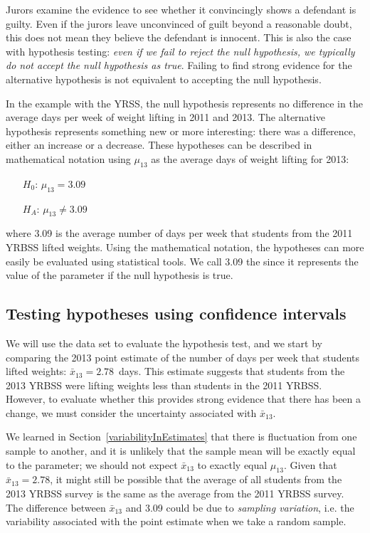 Jurors examine the evidence to see whether it convincingly shows a defendant is guilty. Even if the jurors leave unconvinced of guilt beyond a reasonable doubt, this does not mean they believe the defendant is innocent. This is also the case with hypothesis testing: \emph{even if we fail to reject the null hypothesis, we typically do not accept the null hypothesis as true}. Failing to find strong evidence for the alternative hypothesis is not equivalent to accepting the null hypothesis.

In the example with the YRSS, the null hypothesis represents no difference in the average days per week of weight lifting in 2011 and 2013. The alternative hypothesis represents something new or more interesting: there was a difference, either an increase or a decrease. These hypotheses can be described in mathematical notation using $\mu_{13}$ as the average days of weight lifting for 2013:
\begin{itemize}
\setlength{\itemsep}{0mm}
\item[$H_0$:] $\mu_{13} = 3.09$
\item[$H_A$:] $\mu_{13} \neq 3.09$
\end{itemize}
where 3.09 is the average number of days per week that students from the 2011 YRBSS lifted weights. Using the mathematical notation, the hypotheses can more easily be evaluated using statistical tools. We call 3.09 the  since it represents the value of the parameter if the null hypothesis is true.


\subsection{Testing hypotheses using confidence intervals}
\label{utilizingOurCI}

We will use the  data set to evaluate the hypothesis test, and we start by comparing the 2013 point estimate of the number of days per week that students lifted weights: $\bar{x}_{13} = 2.78$~days. This estimate suggests that students from the 2013 YRBSS were lifting weights less than students in the 2011 YRBSS. However, to evaluate whether this provides strong evidence that there has been a change, we must consider the uncertainty associated with $\bar{x}_{13}$.

We learned in Section~\ref{variabilityInEstimates} that there is fluctuation from one sample to another, and it is unlikely that the sample mean will be exactly equal to the parameter; we should not expect $\bar{x}_{13}$ to exactly equal $\mu_{13}$. Given that $\bar{x}_{13} = 2.78$, it might still be possible that the average of all students from the 2013 YRBSS survey is the same as the average from the 2011 YRBSS survey. The difference between $\bar{x}_{13}$ and 3.09 could be due to \emph{sampling variation}, i.e. the variability associated with the point estimate when we take a random sample.

